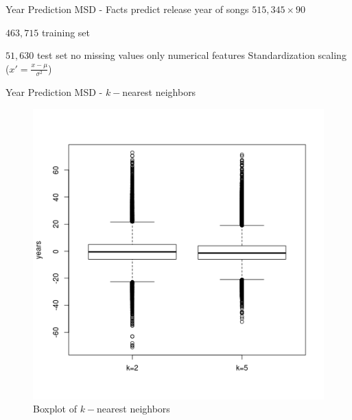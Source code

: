 \begin{frame}{Year Prediction MSD - Facts}
	\bi
	\mi predict release year of songs
	\mi $515,345 \times 90$
	\bi

\item	$463,715$ training set
\item $51,630$ test set
	\ei
	\mi no missing values
	\mi only numerical features
	\bs
	\mi Standardization scaling ($x'=\frac{x-\mu}{\sigma^2}$)
	\ei
\end{frame}
\begin{frame}{Year Prediction MSD - $k-$nearest neighbors}
		\begin{figure}
		\includegraphics[scale=0.42]{../doc/src/report1/figures/ypmsd_nnr.png}
		\caption{Boxplot of $k-$nearest neighbors}
		\end{figure}
\end{frame}

